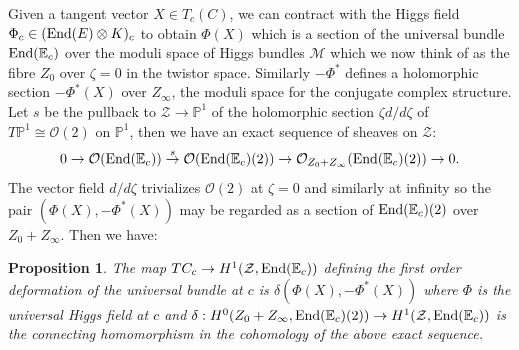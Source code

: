 \documentclass[12pt]{article}
\numberwithin{equation}{section}
\newtheorem{proposition}[theorem]{Proposition}
\theoremstyle{remark}
\theoremstyle{definition}
\numberwithin{theorem}{section}
\def\E{\mathbb{E}}
\newcommand{\End}{\textnormal{End}}
\renewcommand{\1}{\mathbbm{1}}
\def\PP {\mathbb{P}}
\begin{document}
Given a tangent vector  $X\in T_c(C)$, we can contract with the  Higgs field $\Phi_c\in (\End (E) \otimes K)_c$ to obtain $\Phi(X)$ which is a section of the universal bundle $\End (\E_c)$ over  the moduli space of Higgs bundles  ${\mathcal M}$ which we now think of as the fibre $Z_0$ over $\zeta=0$ in the twistor space. Similarly $-\Phi^*$ defines a holomorphic section $-\Phi^*(X)$ over $Z_{\infty}$, the moduli space  for the conjugate complex structure. Let $s$ be the pullback  to ${\mathcal Z}\rightarrow \PP^1$ of the holomorphic section $\zeta d/d\zeta$ of $T\PP^1\cong {\mathcal O}(2)$ on $\PP^1$, then we have an exact sequence of sheaves on  ${\mathcal Z}$:
$$0\rightarrow {\mathcal O}(\End (\E_c))\stackrel {s} \rightarrow {\mathcal O}(\End (\E_c)(2))\rightarrow {\mathcal O}_{Z_0+Z_{\infty}}(\End (\E_c)(2))\rightarrow 0.$$
The vector field  $d/d\zeta$ trivializes ${\mathcal O}(2)$ at $\zeta=0$ and similarly at infinity so the pair $(\Phi(X),-\Phi^*(X))$ may be regarded as a section of $\End (\E_c)(2)$ over $Z_0+Z_{\infty}$. Then we have: 
\begin{proposition} The map $TC_c\rightarrow H^1({\mathcal Z},\End (\E_c))$ defining the first order deformation of the universal bundle at $c$ is $\delta(\Phi(X),-\Phi^*(X))$ where $\Phi$ is the universal Higgs field at $c$ and  $\delta: H^0({Z_0+Z_{\infty}},\End (\E_c)(2))\rightarrow H^1({\mathcal Z},\End (\E_c))$   is the connecting homomorphism in the cohomology of the above exact sequence. 
\end{proposition} 
\end{document}

